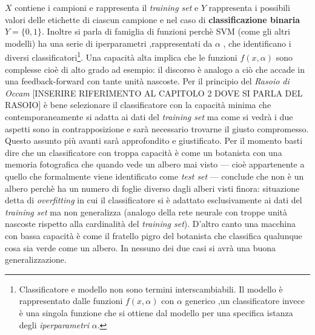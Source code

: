 $X$ contiene i campioni e rappresenta il \textit{training set} e $Y$ rappresenta i possibili valori delle etichette di ciascun campione e nel caso di \textbf{classificazione binaria} $Y=\{0,1\}$. Inoltre si parla di famiglia di funzioni perchè \ac{SVM} (come gli altri modelli) ha una serie di iperparametri ,rappresentati da $\alpha$ , che identificano i diversi classificatori\footnote{Classificatore e modello non sono termini interscambiabili. Il modello è rappresentato dalle funzioni $f(x,\alpha)$ con $\alpha$ generico ,un classificatore invece è una singola funzione che si ottiene dal modello per una specifica istanza degli \textit{iperparametri} $\alpha$.}.  Una capacità alta implica che le funzioni $f(x,\alpha)$ sono complesse cioè di alto grado ad esempio: il discorso è analogo a ciò che accade in una feedback-forward con tante unità nascoste. Per il principio del \textit{Rasoio di Occam} [INSERIRE RIFERIMENTO AL CAPITOLO 2 DOVE SI PARLA DEL RASOIO] è bene selezionare il classificatore con la capacità minima che contemporaneamente si adatta ai dati del \textit{training set} ma come si vedrà i due aspetti sono in contrapposizione e sarà necessario trovarne il giusto compromesso. Questo assunto più avanti sarà approfondito e giustificato. Per il momento basti dire che un classificatore con troppa capacità è come un botanista con una memoria fotografica che quando vede un albero mai visto --- cioè appartenente a quello che formalmente viene identificato come \textit{test set} --- conclude che non è un albero perchè ha un numero di foglie diverso dagli alberi visti finora: situazione detta di \textit{overfitting} in cui il classificatore si è adattato esclusivamente ai dati del \textit{training set} ma non generalizza (analogo della rete neurale con troppe unità nascoste rispetto alla cardinalità del \textit{training set}). D'altro canto una macchina con bassa capacità è come il fratello pigro del botanista  che classifica qualunque cosa sia verde come un albero. In nessuno dei due casi si avrà una buona generalizzazione.

